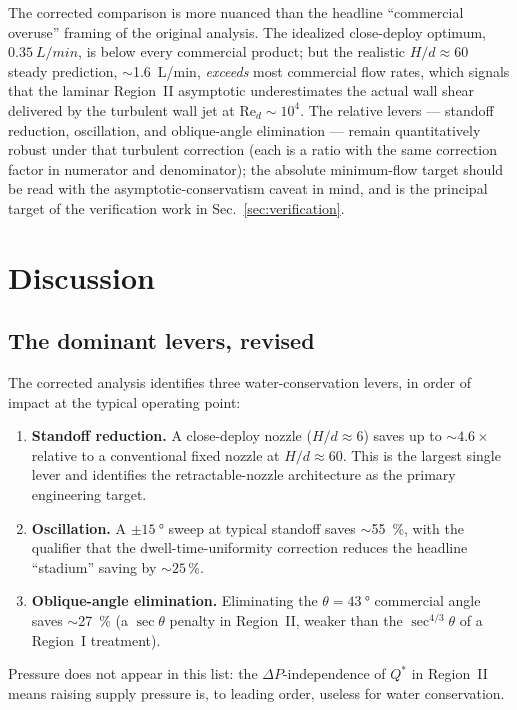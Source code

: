 \documentclass[aps,prfluids,reprint,amsmath,amssymb,floatfix]{revtex4-2}
\newcommand{\Rey}{\mathrm{Re}}
\begin{document}
The corrected comparison is more nuanced than the headline ``commercial
overuse'' framing of the original analysis. The idealized close-deploy
optimum, $\SI{0.35}{L/min}$, is below every commercial product; but the
realistic $H/d \approx 60$ steady prediction, $\sim$\SI{1.6}{L/min},
\emph{exceeds} most commercial flow rates, which signals that
the laminar Region~II asymptotic underestimates the actual wall shear
delivered by the turbulent wall jet at $\Rey_d \sim 10^4$. The relative
levers --- standoff reduction, oscillation, and oblique-angle
elimination --- remain quantitatively robust under that turbulent
correction (each is a ratio with the same correction factor in
numerator and denominator); the absolute minimum-flow target should
be read with the asymptotic-conservatism caveat in mind, and is
the principal target of the verification work in
Sec.~\ref{sec:verification}.

\section{Discussion}
\label{sec:discussion}

\subsection{The dominant levers, revised}

The corrected analysis identifies three water-conservation levers, in
order of impact at the typical operating point:
\begin{enumerate}[leftmargin=*]
  \item \textbf{Standoff reduction.} A close-deploy nozzle ($H/d \approx 6$)
  saves up to $\sim 4.6\times$ relative to a conventional fixed nozzle at
  $H/d \approx 60$. This is the largest single lever and identifies the
  retractable-nozzle architecture as the primary engineering target.
  \item \textbf{Oscillation.} A $\pm\SI{15}{\degree}$ sweep at typical
  standoff saves $\sim$\SI{55}{\percent}, with the qualifier that the
  dwell-time-uniformity correction reduces the headline ``stadium''
  saving by $\sim 25$\,\%.
  \item \textbf{Oblique-angle elimination.} Eliminating the
  $\theta = \SI{43}{\degree}$ commercial angle saves
  $\sim$\SI{27}{\percent} (a $\sec\theta$ penalty in Region~II, weaker
  than the $\sec^{4/3}\theta$ of a Region~I treatment).
\end{enumerate}
Pressure does not appear in this list: the $\Delta P$-independence of
$Q^*$ in Region~II means raising supply pressure is, to leading order,
useless for water conservation.
\end{document}

